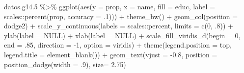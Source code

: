 \documentclass[
  12pt,
]{book}
\newenvironment{Shaded}{\begin{snugshade}}{\end{snugshade}}
\newcommand{\AttributeTok}[1]{\textcolor[rgb]{0.77,0.63,0.00}{#1}}
\newcommand{\ConstantTok}[1]{\textcolor[rgb]{0.00,0.00,0.00}{#1}}
\newcommand{\DecValTok}[1]{\textcolor[rgb]{0.00,0.00,0.81}{#1}}
\newcommand{\FloatTok}[1]{\textcolor[rgb]{0.00,0.00,0.81}{#1}}
\newcommand{\FunctionTok}[1]{\textcolor[rgb]{0.00,0.00,0.00}{#1}}
\newcommand{\NormalTok}[1]{#1}
\newcommand{\SpecialCharTok}[1]{\textcolor[rgb]{0.00,0.00,0.00}{#1}}
\newcommand{\StringTok}[1]{\textcolor[rgb]{0.31,0.60,0.02}{#1}}
\begin{document}
\begin{Shaded}
\begin{Highlighting}[]
\NormalTok{datos.g14}\FloatTok{.5} \SpecialCharTok{\%\textgreater{}\%} 
  \FunctionTok{ggplot}\NormalTok{(}\FunctionTok{aes}\NormalTok{(}\AttributeTok{y =}\NormalTok{ prop, }\AttributeTok{x =}\NormalTok{ name, }\AttributeTok{fill =}\NormalTok{ educ, }
             \AttributeTok{label =}\NormalTok{ scales}\SpecialCharTok{::}\FunctionTok{percent}\NormalTok{(prop, }\AttributeTok{accuracy =}\NormalTok{ .}\DecValTok{1}\NormalTok{))) }\SpecialCharTok{+} 
  \FunctionTok{theme\_bw}\NormalTok{() }\SpecialCharTok{+} 
  \FunctionTok{geom\_col}\NormalTok{(}\AttributeTok{position =} \StringTok{\textquotesingle{}dodge2\textquotesingle{}}\NormalTok{) }\SpecialCharTok{+}
  \FunctionTok{scale\_y\_continuous}\NormalTok{(}\AttributeTok{labels =}\NormalTok{ scales}\SpecialCharTok{::}\NormalTok{percent,}
                     \AttributeTok{limits =} \FunctionTok{c}\NormalTok{(}\DecValTok{0}\NormalTok{, .}\DecValTok{8}\NormalTok{)) }\SpecialCharTok{+}
  \FunctionTok{ylab}\NormalTok{(}\AttributeTok{label =} \ConstantTok{NULL}\NormalTok{) }\SpecialCharTok{+}
  \FunctionTok{xlab}\NormalTok{(}\AttributeTok{label =} \ConstantTok{NULL}\NormalTok{) }\SpecialCharTok{+}
  \FunctionTok{scale\_fill\_viridis\_d}\NormalTok{(}\AttributeTok{begin =} \DecValTok{0}\NormalTok{, }\AttributeTok{end =}\NormalTok{ .}\DecValTok{85}\NormalTok{, }\AttributeTok{direction =} \SpecialCharTok{{-}}\DecValTok{1}\NormalTok{, }\AttributeTok{option =} \StringTok{\textquotesingle{}viridis\textquotesingle{}}\NormalTok{) }\SpecialCharTok{+}
  \FunctionTok{theme}\NormalTok{(}\AttributeTok{legend.position =} \StringTok{\textquotesingle{}top\textquotesingle{}}\NormalTok{,}
        \AttributeTok{legend.title =} \FunctionTok{element\_blank}\NormalTok{()) }\SpecialCharTok{+}
  \FunctionTok{geom\_text}\NormalTok{(}\AttributeTok{vjust =} \SpecialCharTok{{-}}\FloatTok{0.8}\NormalTok{,}
            \AttributeTok{position =} \FunctionTok{position\_dodge}\NormalTok{(}\AttributeTok{width =}\NormalTok{ .}\DecValTok{9}\NormalTok{),}
            \AttributeTok{size=} \FloatTok{2.75}\NormalTok{)}
\end{Highlighting}
\end{Shaded}
\end{document}
